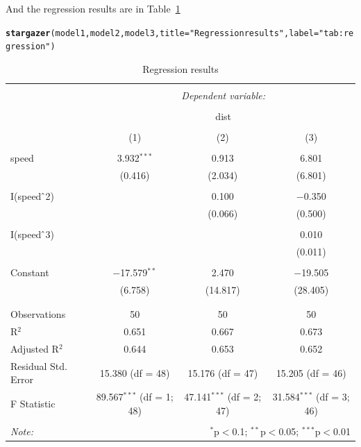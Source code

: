 \documentclass{article}\usepackage[]{graphicx}\usepackage[]{color}
\makeatletter
\newcommand{\hlstr}[1]{\textcolor[rgb]{0.192,0.494,0.8}{#1}}%
\newcommand{\hlstd}[1]{\textcolor[rgb]{0.345,0.345,0.345}{#1}}%
\newcommand{\hlkwc}[1]{\textcolor[rgb]{0.333,0.667,0.333}{#1}}%
\newcommand{\hlkwd}[1]{\textcolor[rgb]{0.737,0.353,0.396}{\textbf{#1}}}%
\newenvironment{kframe}{%
 \def\at@end@of@kframe{}%
 \ifinner\ifhmode%
  \def\at@end@of@kframe{\end{minipage}}%
  \begin{minipage}{\columnwidth}%
 \fi\fi%
 \def\FrameCommand##1{\hskip\@totalleftmargin \hskip-\fboxsep
 \colorbox{shadecolor}{##1}\hskip-\fboxsep
     \hskip-\linewidth \hskip-\@totalleftmargin \hskip\columnwidth}%
 \MakeFramed {\advance\hsize-\width
   \@totalleftmargin\z@ \linewidth\hsize
   \@setminipage}}%
 {\par\unskip\endMakeFramed%
 \at@end@of@kframe}
\makeatother
\begin{document}
And the regression results are in Table~\ref{tab:regression}




\begin{kframe}
\begin{alltt}
\hlkwd{stargazer}\hlstd{(model1, model2, model3,} \hlkwc{title}\hlstd{=}\hlstr{"Regression results"}\hlstd{,} \hlkwc{label}\hlstd{=}\hlstr{"tab:regression"}\hlstd{)}
\end{alltt}
\end{kframe}
\begin{table}[!htbp] \centering 
  \caption{Regression results} 
  \label{tab:regression} 
\begin{tabular}{@{\extracolsep{5pt}}lccc} 
\\[-1.8ex]\hline 
\hline \\[-1.8ex] 
 & \multicolumn{3}{c}{\textit{Dependent variable:}} \\ 
\cline{2-4} 
\\[-1.8ex] & \multicolumn{3}{c}{dist} \\ 
\\[-1.8ex] & (1) & (2) & (3)\\ 
\hline \\[-1.8ex] 
 speed & 3.932$^{***}$ & 0.913 & 6.801 \\ 
  & (0.416) & (2.034) & (6.801) \\ 
  & & & \\ 
 I(speed$\hat{\mkern6mu}$2) &  & 0.100 & $-$0.350 \\ 
  &  & (0.066) & (0.500) \\ 
  & & & \\ 
 I(speed$\hat{\mkern6mu}$3) &  &  & 0.010 \\ 
  &  &  & (0.011) \\ 
  & & & \\ 
 Constant & $-$17.579$^{**}$ & 2.470 & $-$19.505 \\ 
  & (6.758) & (14.817) & (28.405) \\ 
  & & & \\ 
\hline \\[-1.8ex] 
Observations & 50 & 50 & 50 \\ 
R$^{2}$ & 0.651 & 0.667 & 0.673 \\ 
Adjusted R$^{2}$ & 0.644 & 0.653 & 0.652 \\ 
Residual Std. Error & 15.380 (df = 48) & 15.176 (df = 47) & 15.205 (df = 46) \\ 
F Statistic & 89.567$^{***}$ (df = 1; 48) & 47.141$^{***}$ (df = 2; 47) & 31.584$^{***}$ (df = 3; 46) \\ 
\hline 
\hline \\[-1.8ex] 
\textit{Note:}  & \multicolumn{3}{r}{$^{*}$p$<$0.1; $^{**}$p$<$0.05; $^{***}$p$<$0.01} \\ 
\end{tabular} 
\end{table} 
\end{document}
